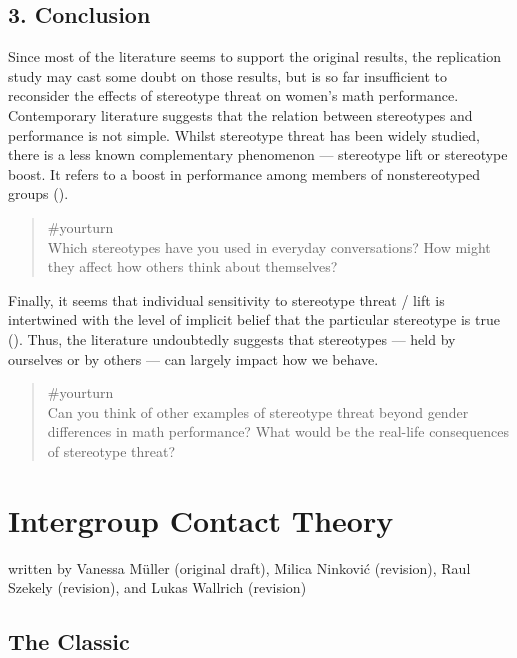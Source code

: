 \documentclass[
  letterpaper,
]{book}
\begin{document}
\section{3. Conclusion}\label{conclusion-17}

Since most of the literature seems to support the original results, the
replication study may cast some doubt on those results, but is so far
insufficient to reconsider the effects of stereotype threat on women's
math performance. Contemporary literature suggests that the relation
between stereotypes and performance is not simple. Whilst stereotype
threat has been widely studied, there is a less known complementary
phenomenon --- stereotype lift or stereotype boost. It refers to a boost
in performance among members of nonstereotyped groups
().

\begin{quote}
{\#yourturn}\\
Which stereotypes have you used in everyday conversations? How might
they affect how others think about themselves?
\end{quote}

Finally, it seems that individual sensitivity to stereotype threat /
lift is intertwined with the level of implicit belief that the
particular stereotype is true
().
Thus, the literature undoubtedly suggests that stereotypes --- held by
ourselves or by others --- can largely impact how we behave.

\begin{quote}
{\#yourturn}\\
Can you think of other examples of stereotype threat beyond gender
differences in math performance? What would be the real-life
consequences of stereotype threat?
\end{quote}


\chapter{\texorpdfstring{{Intergroup Contact
Theory}}{Intergroup Contact Theory}}\label{intergroup-contact-theory}

{written by Vanessa Müller (original draft), Milica Ninković (revision),
Raul Szekely (revision), and Lukas Wallrich (revision)}

\section{The Classic}\label{the-classic-17}
\end{document}
